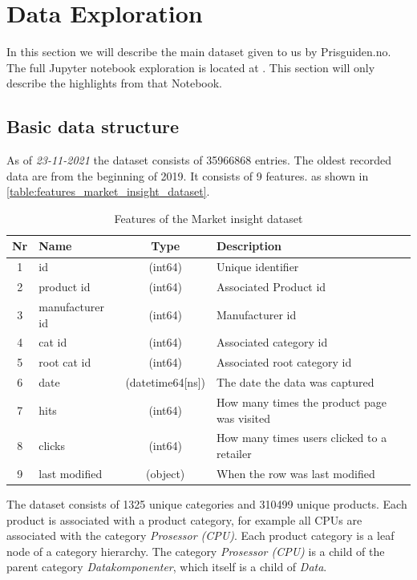 \section{Data Exploration}
\label{section:Architecture:DataExploration}
In this section we will describe the main dataset given to us 
by Prisguiden.no. The full Jupyter notebook exploration
is located at \cite{notebook-data-exploration}. This section will only
describe the highlights from that Notebook.

\subsection{Basic data structure}
As of \textit{23-11-2021} the dataset consists of 35966868 entries.
The oldest recorded data are from the beginning of 2019.
It consists of 9 features.
as shown in \autoref{table:features_market_insight_dataset}.
\begin{table}[htbp]
  \centering
  \caption{Features of the Market insight dataset}
  \label{table:features_market_insight_dataset}
  \begin{tabular}{|c|l|c|l|}\hline\hline
   Nr & Name & Type & Description \\ \hline 
   1 &id &(int64) & Unique identifier \\ \hline
  2 & product id & (int64) & Associated Product id \\ \hline
  3 & manufacturer id & (int64) & Manufacturer id \\ \hline
  4 &cat id & (int64) & Associated category id \\ \hline
  5 & root cat id & (int64) & Associated root category id \\ \hline
  6 & date & (datetime64[ns]) & The date the data was captured \\ \hline
  7 & hits & (int64) & How many times the product page was visited \\ \hline
  8 &clicks & (int64) & How many times users clicked to a retailer \\ \hline
  9 & last modified & (object) & When the row was last modified \\ \hline
  \end{tabular}
\end{table}

The dataset consists of 1325 unique categories and 310499 unique products.
Each product is associated with a product category, for example
all CPUs are associated with the category
\textit{Prosessor (CPU)}.
Each product category is a leaf node of a category hierarchy.
The category \textit{Prosessor (CPU)} is a child of the parent category 
\textit{Datakomponenter}, which itself is a child of \textit{Data}.

